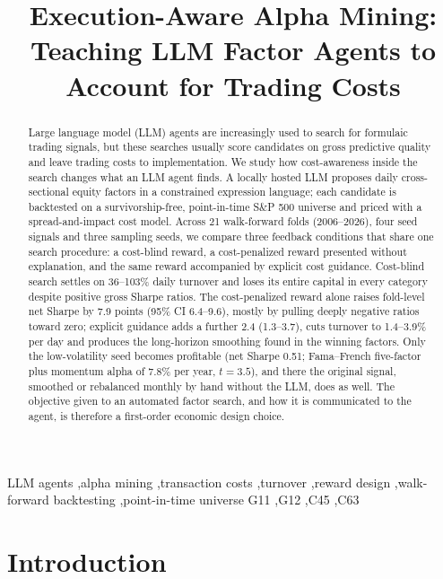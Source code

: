 \documentclass[preprint,12pt,authoryear]{elsarticle}
\begin{document}
\begin{frontmatter}

\title{Execution-Aware Alpha Mining: Teaching LLM Factor Agents to Account for Trading Costs}

\begin{abstract}
Large language model (LLM) agents are increasingly used to search for formulaic trading signals, but these searches usually score candidates on gross predictive quality and leave trading costs to implementation. We study how cost-awareness inside the search changes what an LLM agent finds. A locally hosted LLM proposes daily cross-sectional equity factors in a constrained expression language; each candidate is backtested on a survivorship-free, point-in-time S\&P 500 universe and priced with a spread-and-impact cost model. Across 21 walk-forward folds (2006--2026), four seed signals and three sampling seeds, we compare three feedback conditions that share one search procedure: a cost-blind reward, a cost-penalized reward presented without explanation, and the same reward accompanied by explicit cost guidance. Cost-blind search settles on 36--103\% daily turnover and loses its entire capital in every category despite positive gross Sharpe ratios. The cost-penalized reward alone raises fold-level net Sharpe by 7.9 points (95\% CI 6.4--9.6), mostly by pulling deeply negative ratios toward zero; explicit guidance adds a further 2.4 (1.3--3.7), cuts turnover to 1.4--3.9\% per day and produces the long-horizon smoothing found in the winning factors. Only the low-volatility seed becomes profitable (net Sharpe 0.51; Fama--French five-factor plus momentum alpha of 7.8\% per year, $t = 3.5$), and there the original signal, smoothed or rebalanced monthly by hand without the LLM, does as well. The objective given to an automated factor search, and how it is communicated to the agent, is therefore a first-order economic design choice.
\end{abstract}

\begin{keyword}
LLM agents \sep alpha mining \sep transaction costs \sep turnover \sep reward design \sep walk-forward backtesting \sep point-in-time universe
\JEL G11 \sep G12 \sep C45 \sep C63
\end{keyword}

\end{frontmatter}

\section{Introduction}\label{sec:intro}
\end{document}
